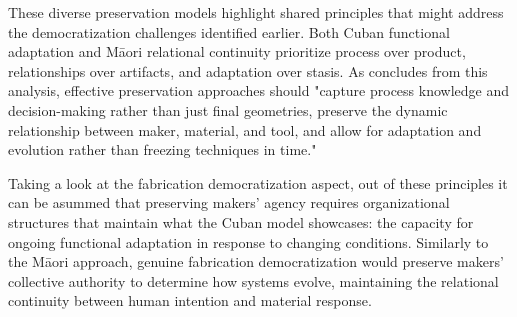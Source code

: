 These diverse preservation models highlight shared principles that might address the democratization challenges identified earlier. Both Cuban functional adaptation and Māori relational continuity prioritize process over product, relationships over artifacts, and adaptation over stasis. As \citet{munoz_zanon_2025} concludes from this analysis, effective preservation approaches should "capture process knowledge and decision-making rather than just final geometries, preserve the dynamic relationship between maker, material, and tool, and allow for adaptation and evolution rather than freezing techniques in time."

\vspace{0.5cm}

Taking a look at the fabrication democratization aspect, out of these principles it can be asummed that preserving makers' agency requires organizational structures that maintain what the Cuban model showcases: the capacity for ongoing functional adaptation in response to changing conditions. Similarly to the Māori approach, genuine fabrication democratization would preserve makers' collective authority to determine how systems evolve, maintaining the relational continuity between human intention and material response.


